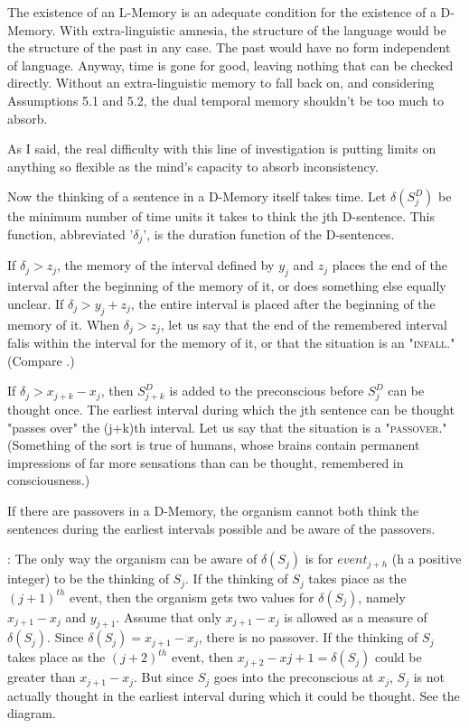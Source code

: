 \documentclass[10pt,twoside]{memoir}
\begin{document}
\begin{enumerate}
{\begin{enumerate}
\begin{sysrules}
\begin{sysrules}
\begin{sysrules}
\begin{sysrules}
{\begin{enumerate}
 The existence of an L-Memory is an adequate condition 
for the existence of a D-Memory. With extra-linguistic amnesia, the 
structure of the language would be the structure of the past in any case. The 
past would have no form independent of language. Anyway, time is gone for 
good, leaving nothing that can be checked directly. Without an 
extra-linguistic memory to fall back on, and considering Assumptions 5.1 
and 5.2, the dual temporal memory shouldn't be too much to absorb. 

As I said, the real difficulty with this line of investigation is putting 
limits on anything so flexible as the mind's capacity to absorb inconsistency. 

Now the thinking of a sentence in a D-Memory itself takes time. Let 
$\delta(S^D_j)$ be the minimum number of time units it takes to think the jth 
D-sentence. This function, abbreviated '$\delta_j$', is the duration function of the 
D-sentences. 

 If $\delta_j\greater z_j$, the memory of the interval defined by $y_j$ and 
$z_j$ places the end of the interval after the beginning of the memory of it, or 
does something else equally unclear. If $\delta_j\greater y_j+z_j$, the entire interval is placed 
after the beginning of the memory of it. When $\delta_j\greater z_j$, let us say that the end 
of the remembered interval falis within the interval for the memory of it, or 
that the situation is an "\textsc{infall}." (Compare .)

 If $\delta_j\greater x_{j+k}-x_j$, then $S^D_{j+k}$ is added to the preconscious 
before $S^D_j$ can be thought once. The earliest interval during which the jth 
sentence can be thought "passes over" the (j+k)th interval. Let us say that 
the situation is a "\textsc{passover}." (Something of the sort is true of humans, 
whose brains contain permanent impressions of far more sensations than can 
be thought, remembered in consciousness.) 

 If there are passovers in a D-Memory, the organism 
cannot both think the sentences during the earliest intervals possible and be 
aware of the passovers. 

\proof: The only way the organism can be aware of $\delta(S_j)$
is for $event_{j+h}$ (h a positive integer) to be the thinking of $S_j$. 
If the thinking of $S_j$ takes piace as the $(j+1)^{th}$ event, then the organism gets two 
values for $\delta(S_j)$, namely $x_{j+1}-x_j$ and $y_{j+1}$. Assume that only $x_{j+1}-x_j$
is allowed as a measure of $\delta(S_j)$. Since $\delta(S_j)=x_{j+1}-x_j$, there is no passover. If 
the thinking of $S_j$ takes place as the $(j+2)^{th}$ event, then $x_{j+2}-x{j+1}=\delta(S_j)$
could be greater than $x_{j+1}-x_j$. But since $S_j$ goes into the preconscious at $x_j$, 
$S_j$ is not actually thought in the earliest interval during which it could be 
thought. See the diagram. 


\end{enumerate}}
\end{sysrules}
\end{sysrules}
\end{sysrules}
\end{sysrules}
\end{enumerate}}
\end{enumerate}
\end{document}
